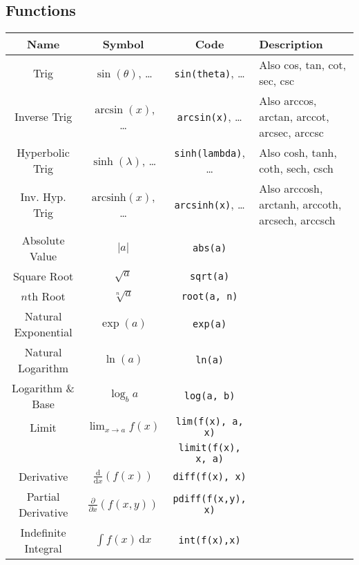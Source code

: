 \documentclass{article}
\begin{document}
  \newpage
  
  \subsection{Functions} %
  \label{sub:functions}
  \begin{table}[!h]
    \centering
    \begin{tabular}{|c|c|c|l|}
      \hline
      \textbf{Name} & \textbf{Symbol} & \textbf{Code} & \textbf{Description} \\
      \hline\hline
      
      Trig & \( \sin(\theta) \), \ldots & \texttt{sin(theta)}, \ldots & Also cos, tan, cot, sec, csc \\
      Inverse Trig & \( \arcsin(x) \), \ldots & \texttt{arcsin(x)}, \ldots & Also arccos, arctan, arccot, arcsec, arccsc \\
      Hyperbolic Trig & \( \sinh(\lambda) \), \ldots & \texttt{sinh(lambda)}, \ldots & Also cosh, tanh, coth, sech, csch \\
      Inv. Hyp. Trig & \( \mathrm{arcsinh}(x) \), \ldots & \texttt{arcsinh(x)}, \ldots & Also arccosh, arctanh, arccoth, arcsech, arccsch \\
      \hline
      Absolute Value & \( \left| a \right| \) & \texttt{abs(a)} & \\
      Square Root & \( \sqrt{a} \) & \texttt{sqrt(a)} & \\
      \(n\)th Root & \( \sqrt[n]{a} \) & \texttt{root(a, n)} & \\
      Natural Exponential & \( \exp(a) \) & \texttt{exp(a)} & \\
      Natural Logarithm & \( \ln(a) \) & \texttt{ln(a)} & \\
      Logarithm \& Base & \( \log_b{a} \) & \texttt{log(a, b)} & \\[2pt]
      Limit & \( \displaystyle\lim_{x\to a} f(x) \) & \texttt{lim(f(x), a, x)} & \\
            & & \texttt{limit(f(x), x, a)} & \\
      Derivative & \( \displaystyle \frac{\mathrm{d}}{\mathrm{d}x} \left( f(x) \right) \) & \texttt{diff(f(x), x)} & \\[6pt]
      Partial Derivative & \( \displaystyle \frac{\partial}{\partial x} \left( f(x,y) \right) \) & \texttt{pdiff(f(x,y), x)} & \\
      Indefinite Integral & \( \displaystyle \int f(x) \,\mathrm{d}x \) & \texttt{int(f(x),x)} & \\[2pt]

\end{tabular}
\end{table}
\end{document}
